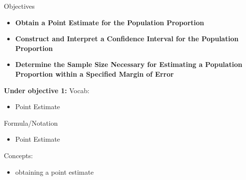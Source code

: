 \documentclass{report}
\begin{document}
        \pagebreak \bigbreak \noindent 
        Objectives
        \begin{itemize}
            \item \textbf{Obtain a Point Estimate for the Population Proportion}
            \item \textbf{Construct and Interpret a Confidence Interval for the Population Proportion}
            \item \textbf{Determine the Sample Size Necessary for Estimating a Population Proportion within a Specified Margin of Error}
        \end{itemize}
        \bigbreak \noindent 
        \textbf{Under objective 1:}
        \bigbreak \noindent 
        Vocab:
        \begin{itemize}
          \item Point Estimate
        \end{itemize}
        \bigbreak \noindent 
        Formula/Notation 
        \begin{itemize}
          \item Point Estimate
        \end{itemize}
        \bigbreak \noindent 
        Concepts:
        \begin{itemize}
          \item obtaining a point estimate
        \end{itemize}
        \bigbreak \noindent 
\end{document}
